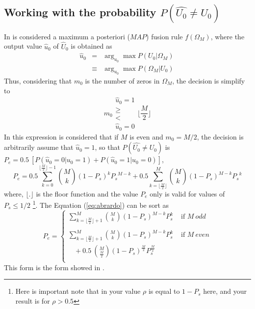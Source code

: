 \documentclass[a4paper,10pt]{article}
\begin{document}
\subsection{Working with the probability $P(\hat{U_0} \neq U_0)$}
In \cite{Abrardo2009,Ferrari2012} is considered a maximum a posteriori ($MAP$) 
fusion rule $f(\Omega_M)$, 
where the output value $\hat{u}_0$ of $\hat{U}_0$
is obtained as
\begin{equation}
\begin{matrix}
 \hat{u}_0 & =      & \arg_{u_0} \max P(U_0|\Omega_M)\\
 ~         & \equiv & \arg_{u_0} \max P(\Omega_M|U_0)\
\end{matrix}
\end{equation}
Thus, considering that $m_0$ is the number of zeros in $\Omega_M$, the decision is simplify to 
\begin{equation}
m_0
\begin{matrix}
\hat{u}_0=1 \\
\geq \\
< \\
\hat{u}_0=0
\end{matrix}
\lfloor \frac{M}{2}\rfloor
\end{equation}
In this expression is considered that if  $M$ is even and $m_0=M/2$, the decision 
is arbitrarily assume that $\hat{u}_0 = 1$,
so that  $P(\hat{U_0} \neq U_0)$ is $P_e=0.5~[ P(\hat{u}_0=0|u_0=1)+P(\hat{u}_0=1|u_0=0) ]$,
\begin{equation} \label{eq:abrardo}
 P_e= 0.5 \sum_{k=0}^{\lfloor \frac{M}{2} \rfloor -1}  \binom{M}{k} {(1-P_s)}^{k}   {P_s}^{M-k} 
    + 0.5 \sum_{k=\lfloor \frac{M}{2}     \rfloor}^{M} \binom{M}{k} {(1-P_s)}^{M-k} {P_s}^{k}   
\end{equation}
where, $\lfloor . \rfloor$ is the floor function and the value $P_e$ only is valid for
values of $P_s \leq 1/2$ 
\footnote{Here is important note that in \cite{Abrardo2009,Ferrari2012} your value $\rho$
is equal to $1-P_s$ here, and your result is for $\rho > 0.5$}. The Equation 
(\ref{eq:abrardo}) can be sort as
\begin{equation}
P_e= 
\begin{cases}
\sum \limits_{k=\lfloor \frac{M}{2} \rfloor +1}^{M} \binom{M}{k}  (1-P_s)^{M-k} P_s^k & \text{ if } M~odd \\ 
~ & ~ \\
\sum \limits_{k=\lfloor \frac{M}{2} \rfloor +1}^{M} \binom{M}{k}  (1-P_s)^{M-k} P_s^k & \text{ if } M~even \\
~~~~+0.5~\binom{M}{\frac{M}{2}}  (1-P_s)^{\frac{M}{2}} P_s^{\frac{M}{2}} & ~ \\
\end{cases}
\end{equation}
This form is the form showed in \cite{XXXX}.
\end{document}
